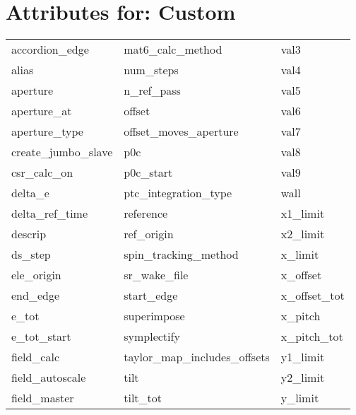  \section{Attributes for: Custom}
 \label{s:list.custom}
 
 \begin{tabular}{lll} \toprule
accordion_edge              & mat6_calc_method            & val3                        \\
alias                       & num_steps                   & val4                        \\
aperture                    & n_ref_pass                  & val5                        \\
aperture_at                 & offset                      & val6                        \\
aperture_type               & offset_moves_aperture       & val7                        \\
create_jumbo_slave          & p0c                         & val8                        \\
csr_calc_on                 & p0c_start                   & val9                        \\
delta_e                     & ptc_integration_type        & wall                        \\
delta_ref_time              & reference                   & x1_limit                    \\
descrip                     & ref_origin                  & x2_limit                    \\
ds_step                     & spin_tracking_method        & x_limit                     \\
ele_origin                  & sr_wake_file                & x_offset                    \\
end_edge                    & start_edge                  & x_offset_tot                \\
e_tot                       & superimpose                 & x_pitch                     \\
e_tot_start                 & symplectify                 & x_pitch_tot                 \\
field_calc                  & taylor_map_includes_offsets & y1_limit                    \\
field_autoscale                & tilt                        & y2_limit                    \\
field_master                & tilt_tot                    & y_limit                     \\

\end{tabular}
